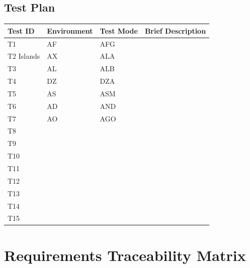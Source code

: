 \documentclass[a4paper,twoside,phd]{BYUPhys}
\begin{document}
\subsection{Test Plan}
\setlength{\arrayrulewidth}{0.5mm}
\setlength{\tabcolsep}{18pt}
\renewcommand{\arraystretch}{2.5}
 
{
\begin{tabular}{ |p{2cm}|p{2cm}|p{2cm}|p{2cm}|  }
\hline
\bf{Test ID} & \bf{Environment} & \bf{Test Mode} & \bf{Brief Description}\\
\hline
T1 & AF &AFG \\
T2 Islands & AX   & ALA \\
T3 &AL & ALB \\
T4 &DZ & DZA \\
T5 & AS & ASM \\
T6 & AD & AND   \\
T7 & AO & AGO \\
T8\\
T9\\
T10\\
T11\\
T12\\
T13\\
T14\\
T15\\
\hline
\end{tabular}
}
\section{Requirements Traceability Matrix}
\setlength{\arrayrulewidth}{0.5mm}
\setlength{\tabcolsep}{18pt}
\renewcommand{\arraystretch}{2.5}
 
\end{document}
